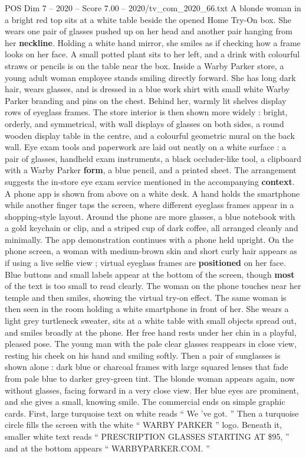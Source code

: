 \begin{textsample}{POS Dim 7 – 2020 – Score 7.00 – 2020/tv\_com\_2020\_66.txt}
A blonde woman in a bright red top sits at a white table beside the opened Home Try-On box.
She wears one pair of glasses pushed up on her head and another pair hanging from her \textbf{neckline}.
Holding a white hand mirror, she smiles as if checking how a frame looks on her face.
A small potted plant sits to her left, and a drink with colourful straws or pencils is on the table near the box.
Inside a Warby Parker store, a young adult woman employee stands smiling directly forward.
She has long dark hair, wears glasses, and is dressed in a blue work shirt with small white Warby Parker branding and pins on the chest.
Behind her, warmly lit shelves display rows of eyeglass frames.
The store interior is then shown more widely : bright, orderly, and symmetrical, with wall displays of glasses on both sides, a round wooden display table in the centre, and a colourful geometric mural on the back wall.
Eye exam tools and paperwork are laid out neatly on a white surface : a pair of glasses, handheld exam instruments, a black occluder-like tool, a clipboard with a Warby Parker \textbf{form}, a blue pencil, and a printed sheet.
The arrangement suggests the in-store eye exam service mentioned in the accompanying \textbf{context}.
A phone app is shown from above on a white desk.
A hand holds the smartphone while another finger taps the screen, where different eyeglass frames appear in a shopping-style layout.
Around the phone are more glasses, a blue notebook with a gold keychain or clip, and a striped cup of dark coffee, all arranged cleanly and minimally.
The app demonstration continues with a phone held upright.
On the phone screen, a woman with medium-brown skin and short curly hair appears as if using a live selfie view ; virtual eyeglass frames are \textbf{positioned} on her face.
Blue buttons and small labels appear at the bottom of the screen, though \textbf{most} of the text is too small to read clearly.
The woman on the phone touches near her temple and then smiles, showing the virtual try-on effect.
The same woman is then seen in the room holding a white smartphone in front of her.
She wears a light grey turtleneck sweater, sits at a white table with small objects spread out, and smiles broadly at the phone.
Her free hand rests under her chin in a playful, pleased pose.
The young man with the pale clear glasses reappears in close view, resting his cheek on his hand and smiling softly.
Then a pair of sunglasses is shown alone : dark blue or charcoal frames with large squared lenses that fade from pale blue to darker grey-green tint.
The blonde woman appears again, now without glasses, facing forward in a very close view.
Her blue eyes are prominent, and she gives a small, knowing smile.
The commercial ends on simple graphic cards.
First, large turquoise text on white reads “ We ’ve got. ” Then a turquoise circle fills the screen with the white “ WARBY PARKER ” logo.
Beneath it, smaller white text reads “ PRESCRIPTION GLASSES STARTING AT \$95, ” and at the bottom appears “ WARBYPARKER.COM. ”

\end{textsample}
